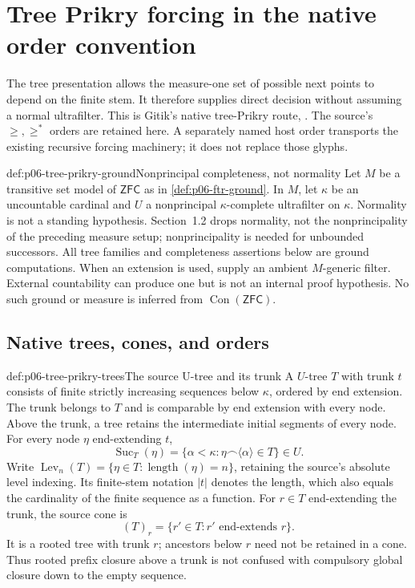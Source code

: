 \section{Tree Prikry forcing in the native order convention}
\label{sec:p06-tree-prikry-forcing}

The tree presentation allows the measure-one set of possible next points
to depend on the finite stem. It therefore supplies direct decision without
assuming a normal ultrafilter. This is Gitik's native tree-Prikry route,
\cite[\S1.2, Definitions~1.14--1.17, Lemmas~1.18--1.24 and
Theorem~1.25]{GitikPrikryAuthorDraft}. The source's \(\geq,\geq^*\)
orders are retained here. A separately named host order transports the
existing recursive forcing machinery; it does not replace those glyphs.

\begin{hbconvention}{def:p06-tree-prikry-ground}{Nonprincipal completeness, not normality}
Let \(M\) be a transitive set model of \(\mathsf{ZFC}\) as in
\cref{def:p06-ftr-ground}. In \(M\), let \(\kappa\) be an uncountable
cardinal and \(U\) a nonprincipal \(\kappa\)-complete ultrafilter on
\(\kappa\). Normality is not a standing hypothesis. Section~1.2 drops
normality, not the nonprincipality of the preceding measure setup;
nonprincipality is needed for unbounded successors. All tree families
and completeness assertions below are ground computations. When an
extension is used, supply an ambient \(M\)-generic filter. External
countability can produce one but is not an internal proof hypothesis.
No such ground or measure is inferred from \(\operatorname{Con}(\mathsf{ZFC})\).
\end{hbconvention}

\subsection{Native trees, cones, and orders}

\begin{hbdefinition}{def:p06-tree-prikry-trees}{The source U-tree and its trunk}
A \(U\)-tree \(T\) with trunk \(t\) consists of finite strictly
increasing sequences below \(\kappa\), ordered by end extension.
The trunk belongs to \(T\) and is comparable by end extension with
every node. Above the trunk, a tree retains the intermediate initial
segments of every node. For every node \(\eta\) end-extending \(t\),
\[
 \operatorname{Suc}_T(\eta)=
   \{\alpha<\kappa:\eta\mathbin{\frown}\langle\alpha\rangle\in T\}\in U.
\]
Write \(\operatorname{Lev}_n(T)=\{\eta\in T:
\operatorname{length}(\eta)=n\}\), retaining the source's absolute
level indexing. Its finite-stem notation \(|t|\) denotes the length,
which also equals the cardinality of the finite sequence as a function.
For \(r\in T\) end-extending the trunk, the source cone is
\[
 (T)_r=\{r'\in T:r'\text{ end-extends }r\}.
\]
It is a rooted tree with trunk \(r\); ancestors below \(r\) need not
be retained in a cone. Thus rooted prefix closure above a trunk is not
confused with compulsory global closure down to the empty sequence.
\end{hbdefinition}

